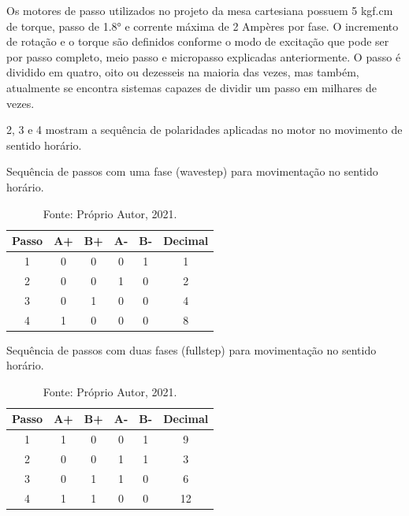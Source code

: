 Os motores de passo utilizados no projeto da mesa cartesiana possuem 5 kgf.cm de torque, passo de 1.8° e 
corrente máxima de 2 Ampères por fase. O incremento de rotação e o torque são definidos conforme o modo 
de excitação que pode ser por passo completo, meio passo e micropasso explicadas anteriormente. O passo 
é dividido em quatro, oito ou dezesseis na maioria das vezes, mas também, atualmente se encontra 
sistemas capazes de  dividir um passo em milhares de vezes.

    
2, 3 e 4 mostram a sequência de polaridades aplicadas no motor no movimento de sentido horário.

\begin{table}
    \centering
    \caption{Sequência de passos com uma fase (wavestep) para movimentação no sentido horário.}
    \begin{tabular}{cccccc}
        \hline
        \textbf{Passo} & \textbf{A+} & \textbf{B+} & \textbf{A-} & \textbf{B-} & \textbf{Decimal}\\
        \hline
        1 & 0 & 0 & 0 & 1 & 1\\
        2 & 0 & 0 & 1 & 0 & 2\\
        3 & 0 & 1 & 0 & 0 & 4\\
        4 & 1 & 0 & 0 & 0 & 8\\        
        \hline       
    \end{tabular}
    \caption*{Fonte: Próprio Autor, 2021.}
    \label{tab:wavestephorario}
\end{table}

\begin{table}
    \centering
    \caption{Sequência de passos com duas fases (fullstep) para movimentação no sentido horário.}
    \begin{tabular}{cccccc}
        \hline
        \textbf{Passo} & \textbf{A+} & \textbf{B+} & \textbf{A-} & \textbf{B-} & \textbf{Decimal}\\
        \hline
        1 & 1 & 0 & 0 & 1 & 9\\
        2 & 0 & 0 & 1 & 1 & 3\\
        3 & 0 & 1 & 1 & 0 & 6\\
        4 & 1 & 1 & 0 & 0 & 12\\
        \hline       
    \end{tabular}
    \caption*{Fonte: Próprio Autor, 2021.}
    \label{tab:fullstephorario}
\end{table}

